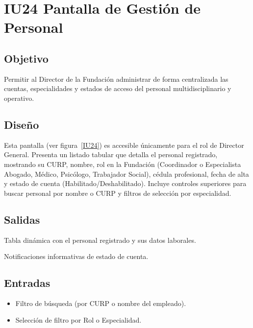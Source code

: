 \section{IU24 Pantalla de Gestión de Personal}

\subsection{Objetivo}
	Permitir al Director de la Fundación administrar de forma centralizada las cuentas, especialidades y estados de acceso del personal multidisciplinario y operativo.

\subsection{Diseño}
	Esta pantalla  (ver figura~\ref{IU24}) es accesible únicamente para el rol de Director General. Presenta un listado tabular que detalla el personal registrado, mostrando su CURP, nombre, rol en la Fundación (Coordinador o Especialista Abogado, Médico, Psicólogo, Trabajador Social), cédula profesional, fecha de alta y estado de cuenta (Habilitado/Deshabilitado).
	Incluye controles superiores para buscar personal por nombre o CURP y filtros de selección por especialidad.


\subsection{Salidas}
	\begin{Citemize}
		\item Tabla dinámica con el personal registrado y sus datos laborales.
		\item Notificaciones informativas de estado de cuenta.
	\end{Citemize}

\subsection{Entradas}
	\begin{itemize}
		\item Filtro de búsqueda (por CURP o nombre del empleado).
		\item Selección de filtro por Rol o Especialidad.
	\end{itemize}

